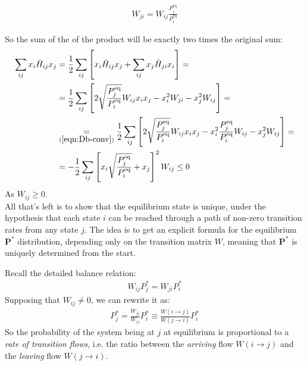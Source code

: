 \documentclass[../template.tex]{subfiles}
\begin{document}
\begin{exo}
\begin{enumerate}
        \begin{align}
            \label{eqn:Db-conv}
            W_{ji} = W_{ij} \frac{P_j^{\mathrm{eq}}}{P_i^{\mathrm{eq} }}
        \end{align}

        So the sum of the  of the product will be exactly two times the original sum:
        \begin{align*}
            \sum_{ij} x_i \hat{H}_{ij} x_j &= \frac{1}{2} \sum_{ij} \left[x_i \hat{H}_{ij} x_j +  \sum_{ij} x_j \hat{H}_{ji} x_i \right] =\\
            &= \frac{1}{2} \sum_{ij} \left[2 \sqrt{\frac{P_j^{\mathrm{eq} }}{P_i^{\mathrm{eq} }} } W_{ij} x_i x_j - x_i^2 W_{ji} - x_j^2 W_{ij}\right] =\\
            &\underset{(\ref{eqn:Db-conv})}{=} \frac{1}{2} \sum_{ij} \left[ 2 \sqrt{\frac{P_j^{\mathrm{eq} }}{P_i^{\mathrm{eq} }} } W_{ij} x_i x_j - x_i^2 \frac{P_j^{\mathrm{eq}}}{P_i^{\mathrm{eq} }} W_{ij} - x_j^2 W_{ij} \right] =\\
            &= -\frac{1}{2} \sum_{ij} \left [x_i \sqrt{\frac{P_j^{\mathrm{eq}}}{P_i^{\mathrm{eq} }}} + x_j \right ]^2 W_{ij} \leq 0
        \end{align*}
        As $W_{ij} \geq 0$. \\


        All that's left is to show that the equilibrium state is unique, under the hypothesis that each state $i$ can be reached through a path of non-zero transition rates from any state $j$.
        The idea is to get an explicit formula for the equilibrium $\bm{P^*}$ distribution, depending only on the transition matrix $W$, meaning that $\bm{P^*}$ is uniquely determined from the start.

        Recall the detailed balance relation:
        \begin{align*}
            W_{ij} P_{j}^* = W_{ji} P_i^*
        \end{align*}
        Supposing that $W_{ij} \neq 0$, we can rewrite it as:
        \begin{align*}
            P_j^* = \frac{W_{ji}}{W_{ij}} P_i^* \equiv \frac{W(i \to j)}{W(j \to i)} P_i^*
        \end{align*}
        So the probability of the system being at $j$ at equilibrium is proportional to a \textit{rate of transition flows}, i.e. the ratio between the \textit{arriving} flow $W(i \to j)$ and the \textit{leaving} flow $W(j \to i)$.
        

\end{enumerate}
\end{exo}
\end{document}
